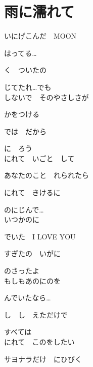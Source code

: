 \section{ 雨に濡れて}
\large{

いにげこんだ　MOON

はってる…

く　ついたの

じてたれ…でも
\\

しないで　そのやさしさが

かをつける

では　だから

に　ろう
\\

にれて　いごと　して

あなたのこと　れられたら

にれて　きけるに

のにじんで…
\\

いつかのに

でいた　I LOVE YOU

すぎたの　いがに

のさったよ
\\

もしもあのにのを

んでいたなら…

し　し　えただけで

すべては　
\\

にれて　このをしたい

サヨナラだけ　にひびく

}
